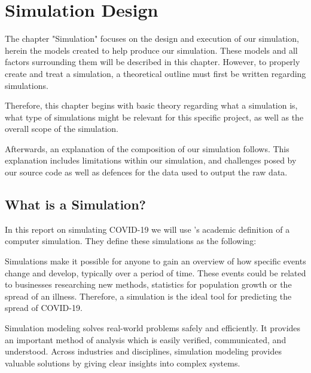 \chapter{Simulation Design} \label{chap:simulation}

The chapter "Simulation" focuses on the design and execution of our simulation, herein the models created to help produce our simulation. These models and all factors surrounding them will be described in this chapter. However, to properly create and treat a simulation, a theoretical outline must first be written regarding simulations. 

Therefore, this chapter begins with basic theory regarding what a simulation is, what type of simulations might be relevant for this specific project, as well as the overall scope of the simulation. 

Afterwards, an explanation of the composition of our simulation follows. This explanation includes limitations within our simulation, and challenges posed by our source code as well as defences for the data used to output the raw data. 

\section{What is a Simulation?}
In this report on simulating COVID-19 we will use \citeauthor{choi_modeling_2013}'s academic definition of a computer simulation. They define these simulations as the following:

 \citep{choi_modeling_2013}

Simulations make it possible for anyone to gain an overview of how specific events change and develop, typically over a period of time. These events could be related to businesses researching new methods, statistics for population growth or the spread of an illness. Therefore, a simulation is the ideal tool for predicting the spread of COVID-19. 

Simulation modeling solves real-world problems safely and efficiently. It provides an important method of analysis which is easily verified, communicated, and understood. Across industries and disciplines, simulation modeling provides valuable solutions by giving clear insights into complex systems.

